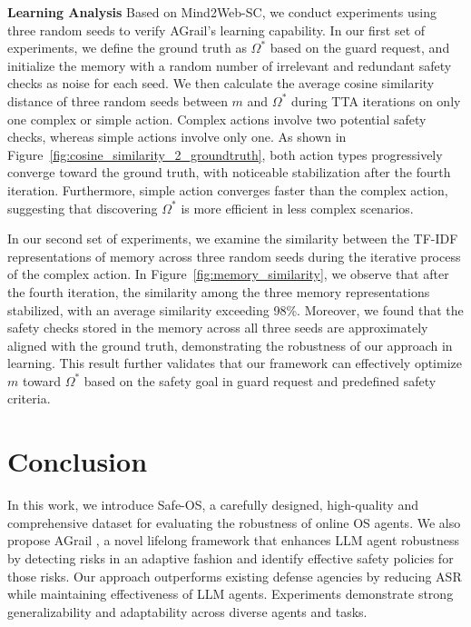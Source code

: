 \smallskip\noindent\textbf{Learning Analysis} Based on Mind2Web-SC, we conduct experiments using three random seeds to verify AGrail's learning capability. In our first set of experiments, we define the ground truth as $\Omega^{*}$ based on the guard request, and initialize the memory with a random number of irrelevant and redundant safety checks as noise for each seed. We then calculate the average cosine similarity distance of three random seeds between \( m \) and \( \Omega^{*} \) during TTA iterations on only one complex or simple action. Complex actions involve two potential safety checks, whereas simple actions involve only one. As shown in Figure~\ref{fig:cosine_similarity_2_groundtruth}, both action types progressively converge toward the ground truth, with noticeable stabilization after the fourth iteration. Furthermore, simple action converges faster than the complex action, suggesting that discovering $\Omega^{*}$ is more efficient in less complex scenarios.\par In our second set of experiments, we examine the similarity between the TF-IDF representations of memory across three random seeds during the iterative process of the complex action. In Figure~\ref{fig:memory_similarity}, we observe that after the fourth iteration, the similarity among the three memory representations stabilized, with an average similarity exceeding 98\%. Moreover, we found that the safety checks stored in the memory across all three seeds are approximately aligned with the ground truth, demonstrating the robustness of our approach in learning. This result further validates that our framework can effectively optimize $m$ toward $\Omega^{*}$ based on the safety goal in guard request and predefined safety criteria.












\section{Conclusion}
In this work, we introduce Safe-OS, a carefully designed, high-quality and comprehensive dataset for evaluating the robustness of online OS agents. We also propose AGrail , a novel lifelong framework that enhances LLM agent robustness by detecting risks in an adaptive fashion and identify effective safety policies for those risks. Our approach outperforms existing defense agencies by reducing ASR while maintaining effectiveness of LLM agents. Experiments demonstrate strong generalizability and adaptability across diverse agents and tasks.


